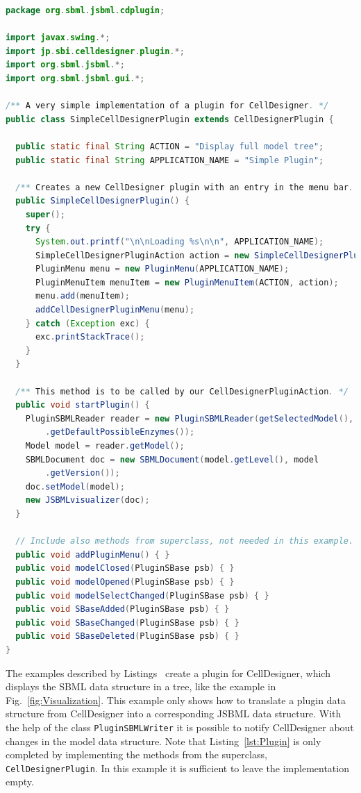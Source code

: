 \begin{lstlisting}[language=Java,float,caption={A simple example for a
CellDesigner plugin using JSBML as a communication layer},label=lst:Plugin]
package org.sbml.jsbml.cdplugin;

import javax.swing.*;
import jp.sbi.celldesigner.plugin.*;
import org.sbml.jsbml.*;
import org.sbml.jsbml.gui.*;

/** A very simple implementation of a plugin for CellDesigner. */
public class SimpleCellDesignerPlugin extends CellDesignerPlugin {

  public static final String ACTION = "Display full model tree";
  public static final String APPLICATION_NAME = "Simple Plugin";

  /** Creates a new CellDesigner plugin with an entry in the menu bar. */
  public SimpleCellDesignerPlugin() {
    super();
    try {
      System.out.printf("\n\nLoading %s\n\n", APPLICATION_NAME);
      SimpleCellDesignerPluginAction action = new SimpleCellDesignerPluginAction(this);
      PluginMenu menu = new PluginMenu(APPLICATION_NAME);
      PluginMenuItem menuItem = new PluginMenuItem(ACTION, action);
      menu.add(menuItem);
      addCellDesignerPluginMenu(menu);
    } catch (Exception exc) {
      exc.printStackTrace();
    }
  }

  /** This method is to be called by our CellDesignerPluginAction. */
  public void startPlugin() {
    PluginSBMLReader reader = new PluginSBMLReader(getSelectedModel(), SBO
        .getDefaultPossibleEnzymes());
    Model model = reader.getModel();
    SBMLDocument doc = new SBMLDocument(model.getLevel(), model
        .getVersion());
    doc.setModel(model);
    new JSBMLvisualizer(doc);
  }

  // Include also methods from superclass, not needed in this example.
  public void addPluginMenu() { }
  public void modelClosed(PluginSBase psb) { }
  public void modelOpened(PluginSBase psb) { }
  public void modelSelectChanged(PluginSBase psb) { }
  public void SBaseAdded(PluginSBase psb) { }
  public void SBaseChanged(PluginSBase psb) { }
  public void SBaseDeleted(PluginSBase psb) { }
}
\end{lstlisting}
The examples described by Listings~
create a plugin for CellDesigner, which displays the SBML data structure
in a tree, like the example in Fig.~\vref{fig:Visualization}. This example only
shows how to translate a plugin data structure
from CellDesigner into a corresponding JSBML data structure. With the help of
the class \texttt{PluginSBMLWriter} it is possible to notify CellDesigner about
changes in the model data structure. Note that Listing~\vref{lst:Plugin} is only
completed by implementing the methods from the superclass,
\texttt{CellDesignerPlugin}. In this example it is sufficient to leave the
implementation empty.


